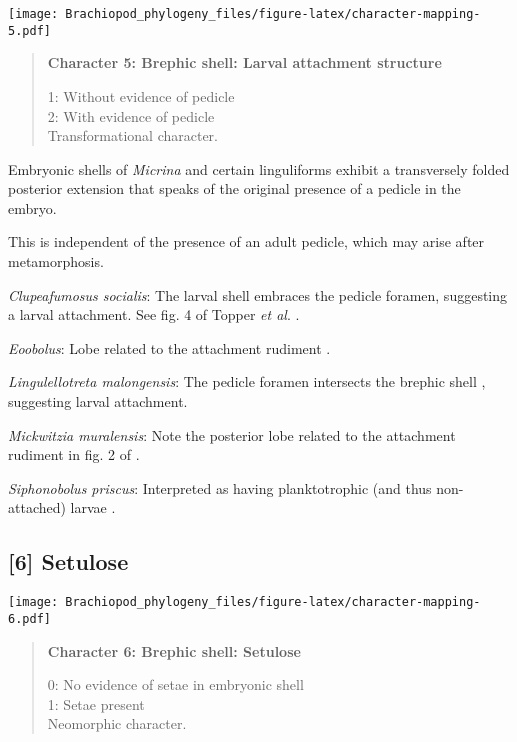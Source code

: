 \documentclass[openany]{book}
\theoremstyle{definition}
\theoremstyle{definition}
\theoremstyle{definition}
\theoremstyle{remark}
\begin{document}
\texttt{[image: Brachiopod\_phylogeny\_files/figure-latex/character-mapping-5.pdf]}

\begin{quote}
\textbf{Character 5: Brephic shell: Larval attachment structure}

1: Without evidence of pedicle\\
2: With evidence of pedicle\\
Transformational character.
\end{quote}

Embryonic shells of \emph{Micrina} and certain linguliforms exhibit a
transversely folded posterior extension that speaks of the original
presence of a pedicle in the embryo.

This is independent of the presence of an adult pedicle, which may arise
after metamorphosis.

\hypertarget{Clupeafumosus_socialis-coding-5}{}
\emph{Clupeafumosus socialis}: The larval shell embraces the pedicle
foramen, suggesting a larval attachment. See fig. 4 of Topper \emph{et
al}. \citeyearpar{Topper2013Reappraisalof}.

\hypertarget{Eoobolus-coding-5}{}
\emph{Eoobolus}: Lobe related to the attachment rudiment \citep[fig.
2]{Balthasar2009Thebrachiopod}.

\hypertarget{Lingulellotreta_malongensis-coding-5}{}
\emph{Lingulellotreta malongensis}: The pedicle foramen intersects the
brephic shell \citep{Holmer1997EarlyCambrian, Li2004}, suggesting larval
attachment.

\hypertarget{Mickwitzia_muralensis-coding-5}{}
\emph{Mickwitzia muralensis}: Note the posterior lobe related to the
attachment rudiment in fig. 2 of \citet{Balthasar2009Thebrachiopod}.

\hypertarget{Siphonobolus_priscus-coding-5}{}
\emph{Siphonobolus priscus}: Interpreted as having planktotrophic (and
thus non-attached) larvae \citep{Popov2009Earlyontogeny}.

\subsection*{{[}6{]} Setulose}\label{setulose}

\texttt{[image: Brachiopod\_phylogeny\_files/figure-latex/character-mapping-6.pdf]}

\begin{quote}
\textbf{Character 6: Brephic shell: Setulose}

0: No evidence of setae in embryonic shell\\
1: Setae present\\
Neomorphic character.
\end{quote}
\end{document}
